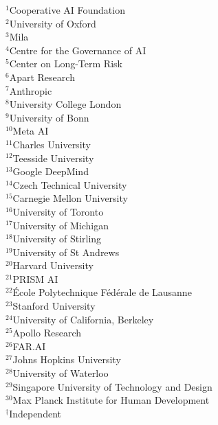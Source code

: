 \documentclass[a4paper]{article}
\begin{document}
\begin{minipage}[t]{0.44\linewidth}
    \raggedright
    \small
    $^{1}${Cooperative AI Foundation}\\
    $^{2}${University of Oxford}\\
    $^{3}${Mila}\\
    $^{4}${Centre for the Governance of AI}\\
    $^{5}${Center on Long-Term Risk}\\
    $^{6}${Apart Research}\\
    $^{7}${Anthropic}\\
    $^{8}${University College London}\\
    $^{9}${University of Bonn}\\
    $^{10}${Meta AI}\\
    $^{11}${Charles University}\\
    $^{12}${Teesside University}\\
    $^{13}${Google DeepMind}\\
    $^{14}${Czech Technical University}\\
    $^{15}${Carnegie Mellon University}\\
    $^{16}${University of Toronto}\\
    $^{17}${University of Michigan}\\
    $^{18}${University of Stirling}\\
    $^{19}${University of St Andrews}\\
    $^{20}${Harvard University}\\
    $^{21}${PRISM AI}\\
    $^{22}${École Polytechnique Fédérale de Lausanne}\\
    $^{23}${Stanford University}\\
    $^{24}${University of California, Berkeley}\\
    $^{25}${Apollo Research}\\
    $^{26}${FAR.AI}\\
    $^{27}${Johns Hopkins University}\\
    $^{28}${University of Waterloo}\\
    $^{29}${Singapore University of Technology and Design}\\
    $^{30}${Max Planck Institute for Human Development}\\
    $^\dagger${Independent}
\end{minipage}
\end{document}
